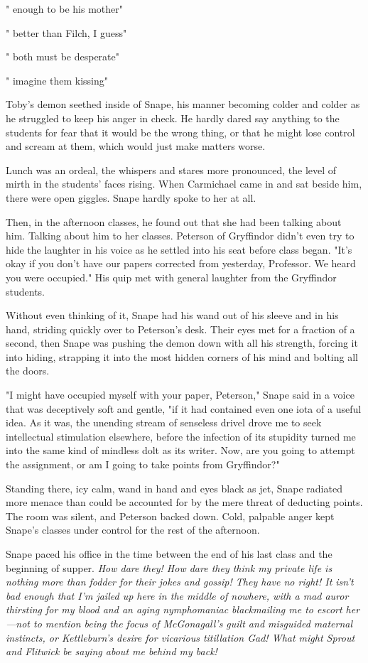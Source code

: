 "{\el} enough to be his mother{\el}"

"{\el} better than Filch, I guess{\el}"

"{\el} both must be desperate{\el}"

"{\el} imagine them kissing{\el}"

Toby's demon seethed inside of Snape, his manner becoming colder and colder as he struggled to keep his anger in check. He hardly dared say anything to the students for fear that it would be the wrong thing, or that he might lose control and scream at them, which would just make matters worse.

Lunch was an ordeal, the whispers and stares more pronounced, the level of mirth in the students' faces rising. When Carmichael came in and sat beside him, there were open giggles. Snape hardly spoke to her at all.

Then, in the afternoon classes, he found out that she had been talking about him. Talking about him to her classes. Peterson of Gryffindor didn't even try to hide the laughter in his voice as he settled into his seat before class began. "It's okay if you don't have our papers corrected from yesterday, Professor. We heard you were{\el} occupied." His quip met with general laughter from the Gryffindor students.

Without even thinking of it, Snape had his wand out of his sleeve and in his hand, striding quickly over to Peterson's desk. Their eyes met for a fraction of a second, then Snape was pushing the demon down with all his strength, forcing it into hiding, strapping it into the most hidden corners of his mind and bolting all the doors.

"I might have occupied myself with your paper, Peterson," Snape said in a voice that was deceptively soft and gentle, "if it had contained even one iota of a useful idea. As it was, the unending stream of senseless drivel drove me to seek intellectual stimulation elsewhere, before the infection of its stupidity turned me into the same kind of mindless dolt as its writer. Now, are you going to attempt the assignment, or am I going to take points from Gryffindor?"

Standing there, icy calm, wand in hand and eyes black as jet, Snape radiated more menace than could be accounted for by the mere threat of deducting points. The room was silent, and Peterson backed down. Cold, palpable anger kept Snape's classes under control for the rest of the afternoon.

Snape paced his office in the time between the end of his last class and the beginning of supper. \emph{How dare they! How dare they think my private life is nothing more than fodder for their jokes and gossip! They have no right! It isn't bad enough that I'm jailed up here in the middle of nowhere, with a mad auror thirsting for my blood and an aging nymphomaniac blackmailing me to escort her—not to mention being the focus of McGonagall's guilt and misguided maternal instincts, or Kettleburn's desire for vicarious titillation{\el} Gad! What might Sprout and Flitwick be saying about me behind my back!}

